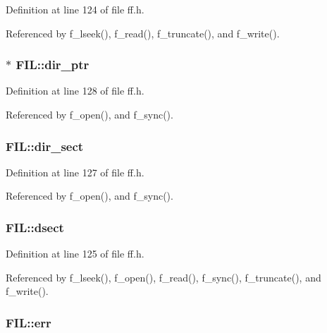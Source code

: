Definition at line 124 of file ff.\-h.



Referenced by f\-\_\-lseek(), f\-\_\-read(), f\-\_\-truncate(), and f\-\_\-write().

\hypertarget{structFIL_a5af9e9fb312b629220eaf684dd28c4a9}{
\subsubsection[{dir\-\_\-ptr}]{$\ast$ F\-I\-L\-::dir\-\_\-ptr}}\label{structFIL_a5af9e9fb312b629220eaf684dd28c4a9}


Definition at line 128 of file ff.\-h.



Referenced by f\-\_\-open(), and f\-\_\-sync().

\hypertarget{structFIL_ab203794f939ad4480e81dfa488770783}{
\subsubsection[{dir\-\_\-sect}]{ F\-I\-L\-::dir\-\_\-sect}}\label{structFIL_ab203794f939ad4480e81dfa488770783}


Definition at line 127 of file ff.\-h.



Referenced by f\-\_\-open(), and f\-\_\-sync().

\hypertarget{structFIL_ab3d4165d6fd32ac71a130d835fbf0b4d}{
\subsubsection[{dsect}]{ F\-I\-L\-::dsect}}\label{structFIL_ab3d4165d6fd32ac71a130d835fbf0b4d}


Definition at line 125 of file ff.\-h.



Referenced by f\-\_\-lseek(), f\-\_\-open(), f\-\_\-read(), f\-\_\-sync(), f\-\_\-truncate(), and f\-\_\-write().

\hypertarget{structFIL_aea440945db26de9c4a88065c0c887fda}{
\subsubsection[{err}]{ F\-I\-L\-::err}}\label{structFIL_aea440945db26de9c4a88065c0c887fda}


